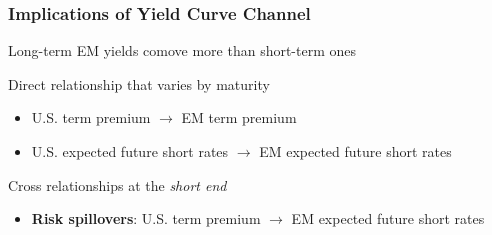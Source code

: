 \documentclass[12pt, aspectratio=169, xcolor=dvipsnames]{beamer}
\begin{document}
\begin{frame}
\frametitle{Implications of Yield Curve Channel}

Long-term EM yields \alert{comove more} than short-term ones

\alert{Direct} relationship that varies by maturity
\begin{itemize}
\item U.S. term premium \(\rightarrow\) EM term premium
\item U.S. expected future short rates \(\rightarrow\) EM expected future short rates
\end{itemize}

\alert{Cross} relationships at the \textit{short end}
\begin{itemize}
\item \textbf{Risk spillovers}: U.S. term premium \(\rightarrow\) EM expected future short rates
\end{itemize}
\end{frame}

\end{document}
